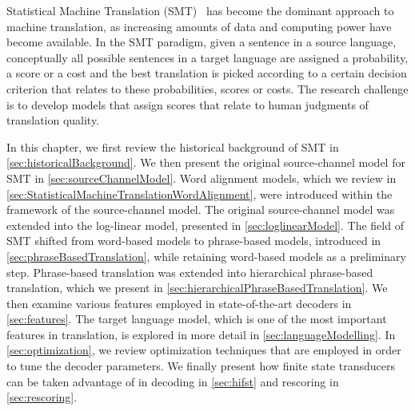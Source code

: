 



Statistical Machine Translation (SMT)~\citep{brown-dellapietra-dellapietra-mercer-1993,lopez:2008:ACMComputingSurveys,koehn:2010:book}
has become the dominant approach to machine translation, as increasing
amounts of data and computing power have become available.
In the SMT paradigm, given a sentence in a source language,
conceptually all
possible sentences in a target language are assigned a probability, a
score or a cost and the best translation is picked according to a certain
decision criterion that relates to these probabilities, scores or costs.
The research challenge is to develop models that assign scores that
relate to human judgments of translation quality.


In this chapter, we first review the historical background of SMT in
\autoref{sec:historicalBackground}.
We then present the original source-channel model for SMT
in \autoref{sec:sourceChannelModel}.
Word alignment models, which we review in
\autoref{sec:StatisticalMachineTranslationWordAlignment},
were introduced within the framework of the source-channel
model. The original source-channel model was extended into the log-linear
model, presented in \autoref{sec:loglinearModel}.
The field of SMT shifted from word-based models to phrase-based
models, introduced in \autoref{sec:phraseBasedTranslation}, while
retaining word-based models as a preliminary step.
Phrase-based translation was extended into hierarchical
phrase-based translation, which we present in
\autoref{sec:hierarchicalPhraseBasedTranslation}.
We then
examine various features employed in state-of-the-art decoders in
\autoref{sec:features}. The target language model, which
is one of the most important features in translation, is explored in
more detail in \autoref{sec:languageModelling}. In
\autoref{sec:optimization}, we review optimization techniques that
are employed in order to tune the decoder parameters. We finally present
how finite state transducers can be taken advantage of in decoding
in \autoref{sec:hifst} and rescoring in \autoref{sec:rescoring}.

